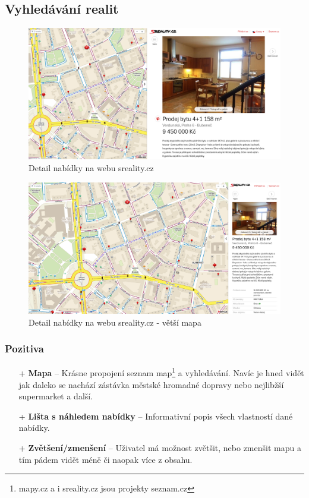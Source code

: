 
\newpage
\subsection{Vyhledávání realit}
\begin{figure}[h]
    \centering
    \includegraphics[width=1.0\textwidth]{media/sreality/detail.png}
    \caption{Detail nabídky na webu sreality.cz}
    \label{fig:sreality:detail}
\end{figure}
\begin{figure}[h]
    \centering
    \includegraphics[width=1.0\textwidth]{media/sreality/detail-big-map.png}
    \caption{Detail nabídky na webu sreality.cz - větší mapa}
    \label{fig:sreality:detail-big-map}
\end{figure}
\subsubsection*{Pozitiva}
\begin{itemize}
    \item[+] \textbf{Mapa} -- Krásne propojení seznam map\footnote{mapy.cz a i sreality.cz jsou projekty seznam.cz} a vyhledávání. Navíc je hned vidět jak daleko se nachází zástávka městské hromadné dopravy nebo nejlibžší supermarket a další.
    \item[+] \textbf{Lišta s náhledem nabídky} -- Informativní popis všech vlastností dané nabídky.
    \item[+] \textbf{Zvětšení/zmenšení} -- Uživatel má možnost zvětšit, nebo zmenšit mapu a tím pádem vidět méně či naopak více z obsahu.
\end{itemize}
